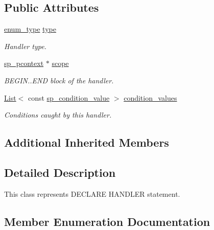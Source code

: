 \subsection*{Public Attributes}
\begin{DoxyCompactItemize}
\item 
\mbox{\label{classsp__handler_ad3407548a940e4ad79d9156b462b98cd}} 
\mbox{\hyperlink{classsp__handler_a702400dd1cd8b2933a38a9e4a5f1eb09}{enum\+\_\+type}} \mbox{\hyperlink{classsp__handler_ad3407548a940e4ad79d9156b462b98cd}{type}}
\begin{DoxyCompactList}\small\item\em Handler type. \end{DoxyCompactList}\item 
\mbox{\label{classsp__handler_aee9a6c48f92bbb24739b58fdf0fffa1e}} 
\mbox{\hyperlink{classsp__pcontext}{sp\+\_\+pcontext}} $\ast$ \mbox{\hyperlink{classsp__handler_aee9a6c48f92bbb24739b58fdf0fffa1e}{scope}}
\begin{DoxyCompactList}\small\item\em B\+E\+G\+IN..E\+ND block of the handler. \end{DoxyCompactList}\item 
\mbox{\label{classsp__handler_ab0c9aeba31a560288dc1cdc9f7c1406b}} 
\mbox{\hyperlink{classList}{List}}$<$ const \mbox{\hyperlink{classsp__condition__value}{sp\+\_\+condition\+\_\+value}} $>$ \mbox{\hyperlink{classsp__handler_ab0c9aeba31a560288dc1cdc9f7c1406b}{condition\+\_\+values}}
\begin{DoxyCompactList}\small\item\em Conditions caught by this handler. \end{DoxyCompactList}\end{DoxyCompactItemize}
\subsection*{Additional Inherited Members}


\subsection{Detailed Description}
This class represents \textquotesingle{}D\+E\+C\+L\+A\+RE H\+A\+N\+D\+L\+ER\textquotesingle{} statement. 

\subsection{Member Enumeration Documentation}
\mbox{\label{classsp__handler_a702400dd1cd8b2933a38a9e4a5f1eb09}} 
